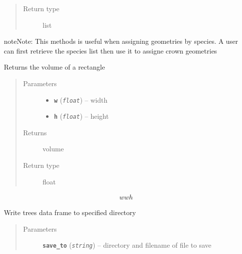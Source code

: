\documentclass[letterpaper,10pt,english]{sphinxmanual}
\begin{document}
\begin{fulllineitems}
\begin{fulllineitems}
\begin{quote}
\begin{description}
\item[{Return type}] \leavevmode
list

\end{description}\end{quote}

\begin{notice}{note}{Note:}
This methods is useful when assigning geometries by species.
A user can first retrieve the species list then use it to
assigne crown geometries
\end{notice}

\end{fulllineitems}


\begin{fulllineitems}
\label{fuels_FuelCalc:fuels.FuelCalc.rectangle_volume}
Returns the volume of a rectangle
\begin{quote}\begin{description}
\item[{Parameters}] \leavevmode\begin{itemize}
\item {} 
\textbf{\texttt{w}} (\emph{\texttt{float}}) -- width

\item {} 
\textbf{\texttt{h}} (\emph{\texttt{float}}) -- height

\end{itemize}

\item[{Returns}] \leavevmode
volume

\item[{Return type}] \leavevmode
float

\end{description}\end{quote}
\begin{equation*}
\begin{split}wwh\end{split}
\end{equation*}
\end{fulllineitems}


\begin{fulllineitems}
\label{fuels_FuelCalc:fuels.FuelCalc.save_trees}
Write trees data frame to specified directory
\begin{quote}\begin{description}
\item[{Parameters}] \leavevmode
\textbf{\texttt{save\_to}} (\emph{\texttt{string}}) -- directory and filename of file to save


\end{description}
\end{quote}
\end{fulllineitems}
\end{fulllineitems}
\end{document}
